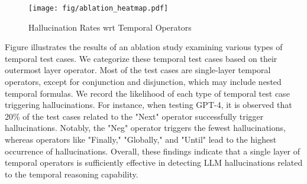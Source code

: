 
\begin{figure}[ht]  %
    \centering
    \texttt{[image: fig/ablation\_heatmap.pdf]}  %
    \caption{Hallucination Rates wrt Temporal Operators}  %
    \label{fig:heatmap}  %
\end{figure}



Figure  illustrates the results of an ablation study examining various types of temporal test cases. We categorize these temporal test cases based on their outermost layer operator. Most of the test cases are single-layer temporal operators, except for conjunction and disjunction, which may include nested temporal formulas.
We record the likelihood of each type of temporal test case triggering hallucinations. For instance, when testing GPT-4, it is observed that 20\% of the test cases related to the "Next" operator successfully trigger hallucinations. 
Notably, the "Neg" operator triggers the fewest hallucinations, whereas operators like "Finally," "Globally," and "Until" lead to the highest occurrence of hallucinations.
Overall, these findings indicate that a single layer of temporal operators is sufficiently effective in detecting LLM hallucinations related to the temporal reasoning capability. 

